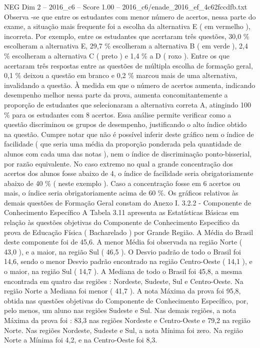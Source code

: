 \begin{textsample}{NEG Dim 2 – 2016\_c6 – Score 1.00 – 2016\_c6/enade\_2016\_ef\_4c62fccdfb.txt}
Observa -se que entre os estudantes com menor número de acertos, nessa parte do exame, a situação mais frequente foi a escolha da alternativa E ( em vermelho ), incorreta.
Por exemplo, entre os estudantes que acertaram três questões, 30,0 \% escolheram a alternativa E, 29,7 \% escolheram a alternativa B ( em verde ), 2,4 \% escolheram a alternativa C ( preto ) e 1,4 \% a D ( roxo ).
Entre os que acertaram três respostas entre as questões de múltipla escolha de formação geral, 0,1 \% deixou a questão em branco e 0,2 \% marcou mais de uma alternativa, invalidando a questão.
À medida em que o número de acertos aumenta, indicando desempenho melhor nessa parte da prova, aumenta concomitantemente a proporção de estudantes que selecionaram a alternativa correta A, atingindo 100 \% para os estudantes com 8 acertos.
Essa análise permite verificar como a questão discriminou os grupos de desempenho, justificando o alto índice obtido na questão.
Cumpre notar que não é possível inferir deste gráfico nem o índice de facilidade ( que seria uma média da proporção ponderada pela quantidade de alunos com cada uma das notas ), nem o índice de discriminação ponto-bisserial, por razão equivalente.
No caso extremo no qual a grande concentração dos acertos dos alunos fosse abaixo de 4, o índice de facilidade seria obrigatoriamente abaixo de 40 \% ( neste exemplo ).
Caso a concentração fosse em 6 acertos ou mais, o índice seria obrigatoriamente acima de 60 \%.
Os gráficos relativos às demais questões de Formação Geral constam do Anexo I. 3.2.2 - Componente de Conhecimento Específico A Tabela 3.11 apresenta as Estatísticas Básicas em relação às questões objetivas do Componente de Conhecimento Específico da prova de Educação Física ( Bacharelado ) por Grande Região.
A Média do Brasil deste componente foi de 45,6.
A menor Média foi observada na região Norte ( 43,0 ), e a maior, na região Sul ( 46,5 ).
O Desvio padrão de todo o Brasil foi 14,6, sendo o menor Desvio padrão encontrado na região Centro-Oeste ( 14,1 ), e o maior, na região Sul ( 14,7 ).
A Mediana de todo o Brasil foi 45,8, a mesma encontrada em quatro das regiões : Nordeste, Sudeste, Sul e Centro-Oeste.
Na região Norte a Mediana foi menor ( 41,7 ).
A nota Máxima da prova foi 95,8, obtida nas questões objetivas do Componente de Conhecimento Específico, por, pelo menos, um aluno nas regiões Sudeste e Sul.
Nas demais regiões, a nota Máxima da prova foi : 83,3 nas regiões Nordeste e Centro-Oeste e 79,2 na região Norte.
Nas regiões Nordeste, Sudeste e Sul, a nota Mínima foi zero.
Na região Norte a Mínima foi 4,2, e na Centro-Oeste foi 8,3.

\end{textsample}
